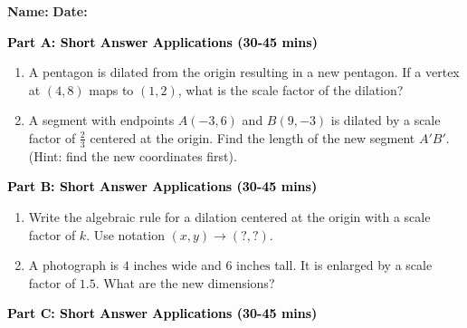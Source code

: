 \documentclass[12pt, letterpaper, fleqn]{article}
\begin{document}
\textbf{Name:} \underline{\hspace{5cm}}
\hfill
\textbf{Date:} \underline{\hspace{3cm}}\\


\begin{tcolorbox}[colback=customteal!20]
\large\textcolor{black}{\textbf{Part A: Short Answer Applications (30-45 mins)}}
\end{tcolorbox}

\vspace{3mm}

\begin{enumerate}[itemsep=4.2cm, leftmargin=0.6cm]
\item A pentagon is dilated from the origin resulting in a new pentagon. If a vertex at $(4, 8)$ maps to $(1, 2)$, what is the scale factor of the dilation?
\item A segment with endpoints $A(-3, 6)$ and $B(9, -3)$ is dilated by a scale factor of $\frac{2}{3}$ centered at the origin. Find the length of the new segment $A'B'$. (Hint: find the new coordinates first).
\end{enumerate}

\newpage

\begin{tcolorbox}[colback=customteal!20]
\large\textcolor{black}{\textbf{Part B: Short Answer Applications (30-45 mins)}}
\end{tcolorbox}

\vspace{3mm}

\begin{enumerate}[itemsep=4.2cm, leftmargin=0.6cm, resume]
\item Write the algebraic rule for a dilation centered at the origin with a scale factor of $k$. Use notation $(x, y) \rightarrow (?, ?)$.
\item A photograph is $4\text{ inches}$ wide and $6\text{ inches}$ tall. It is enlarged by a scale factor of $1.5$. What are the new dimensions?
\end{enumerate}

\newpage

\begin{tcolorbox}[colback=customteal!20]
\large\textcolor{black}{\textbf{Part C: Short Answer Applications (30-45 mins)}}
\end{tcolorbox}

\vspace{3mm}
\end{document}
